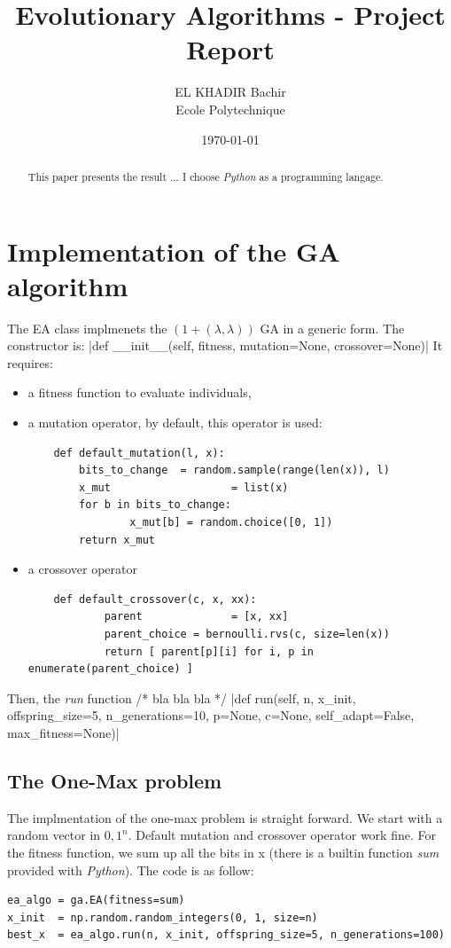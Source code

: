 \documentclass{article}
\begin{document}
\title{Evolutionary Algorithms - Project Report }
\author{EL KHADIR Bachir \\
Ecole Polytechnique}
\date{\today}
\maketitle


\begin{abstract}
This paper presents the result ...
I choose \textit{Python} as a programming langage.
\end{abstract}

\section{Implementation of the GA algorithm}
The EA class implmenets the $(1+(\lambda, \lambda))$ GA in a generic form. The constructor is:
|def __init__(self, fitness, mutation=None, crossover=None)|
It requires:
\begin{itemize}
	\item a fitness function to evaluate individuals,
	\item a mutation operator, by default, this operator is used:
\begin{verbatim}
	def default_mutation(l, x):
		bits_to_change 	= random.sample(range(len(x)), l)
		x_mut 					= list(x)
		for b in bits_to_change:
				x_mut[b] = random.choice([0, 1])
		return x_mut
\end{verbatim}
	\item a crossover operator
\begin{verbatim}
	def default_crossover(c, x, xx):
			parent 				= [x, xx]
			parent_choice = bernoulli.rvs(c, size=len(x))
			return [ parent[p][i] for i, p in enumerate(parent_choice) ]
\end{verbatim}
		
\end{itemize}

Then, the \textit{run} function /* bla bla bla */
|def run(self, n, x_init, offspring_size=5, n_generations=10, p=None, c=None, self_adapt=False, max_fitness=None)|

\subsection{The One-Max problem}
The implmentation of the one-max problem is straight forward. 
We start with a random vector in ${0, 1}^n$. Default mutation and crossover operator work fine. 
For the fitness function, we sum up all the bits in x (there is a builtin function \textit{sum} provided with \textit{Python}). The code is as follow:
\begin{verbatim}
ea_algo = ga.EA(fitness=sum)
x_init 	= np.random.random_integers(0, 1, size=n)
best_x 	= ea_algo.run(n, x_init, offspring_size=5, n_generations=100)
\end{verbatim}
\end{document}
